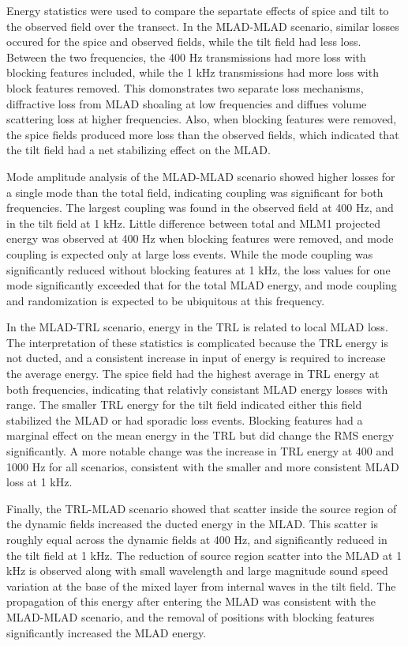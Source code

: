 \documentclass[preprint,NumberedRefs]{JASA}
\begin{document}
Energy statistics were used to compare the separtate effects of spice and tilt to the observed field over the transect. In the MLAD-MLAD scenario, similar losses occured for the spice and observed fields, while the tilt field had less loss. Between the two frequencies, the 400 Hz transmissions had more loss with blocking features included, while the 1 kHz transmissions had more loss with block features removed. This domonstrates two separate loss mechanisms, diffractive loss from MLAD shoaling at low frequencies and diffues volume scattering loss at higher frequencies\cite{colosi2020observations}. Also, when blocking features were removed, the spice fields produced more loss than the observed fields, which indicated that the tilt field had a net stabilizing effect on the MLAD.

Mode amplitude analysis of the MLAD-MLAD scenario showed higher losses for a single mode than the total field, indicating coupling was significant for both frequencies. The largest coupling was found in the observed field at 400 Hz, and in the tilt field at 1 kHz. Little difference between total and MLM1 projected energy was observed at 400 Hz when blocking features were removed, and mode coupling is expected only at large loss events. While the mode coupling was significantly reduced without blocking features at 1 kHz, the loss values for one mode significantly exceeded that for the total MLAD energy, and mode coupling and randomization is expected to be ubiquitous at this frequency.

In the MLAD-TRL scenario, energy in the TRL is related to local MLAD loss. The interpretation of these statistics is complicated because the TRL energy is not ducted, and a consistent increase in input of energy is required to increase the average energy. The spice field had the highest average in TRL energy at both frequencies, indicating that relativly consistant MLAD energy losses with range. The smaller TRL energy for the tilt field indicated either this field stabilized the MLAD or had sporadic loss events. Blocking features had a marginal effect on the mean energy in the TRL but did change the RMS energy significantly. A more notable change was the increase in TRL energy at 400 and 1000 Hz for all scenarios, consistent with the smaller and more consistent MLAD loss at 1 kHz.

Finally, the TRL-MLAD scenario showed that scatter inside the source region of the dynamic fields increased the ducted energy in the MLAD. This scatter is roughly equal across the dynamic fields at 400 Hz, and significantly reduced in the tilt field at 1 kHz. The reduction of source region scatter into the MLAD at 1 kHz is observed along with small wavelength and large magnitude sound speed variation at the base of the mixed layer from internal waves in the tilt field. The propagation of this energy after entering the MLAD was consistent with the MLAD-MLAD scenario, and the removal of positions with blocking features significantly increased the MLAD energy.
\end{document}
